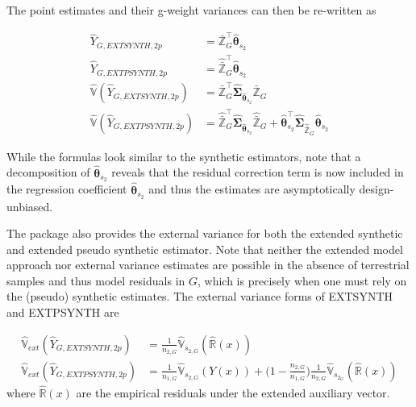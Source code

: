 \documentclass[article]{jss}
\newcommand{\var}{\mathbb{V}}
\begin{document}
The point estimates and their g-weight variances can then be re-written as

\begin{subequations}\label{eq:pest_2p_extsynth_extpsynth}
\begin{align}
\hat{Y}_{G,EXTSYNTH,2p} & = \bar{\pmb{\mathbb{Z}}}^{\top}_{G}\hat{\pmb{\theta}}_{s_2} \label{eq:pointest_2p_extsynth} \\
\hat{Y}_{G,EXTPSYNTH,2p} & =\hat{\bar{\pmb{\mathbb{Z}}}}_{G}^{\top}\hat{\pmb{\theta}}_{s_2} \label{eq:pointest_2p_extsynth} \\
\hat{\var}(\hat{Y}_{G,EXTSYNTH,2p}) & = \bar{\pmb{\mathbb{Z}}}^{\top}_{G}\hat{\pmb{\Sigma}}_{\hat{\pmb{\theta}}_{s_2}}\bar{\pmb{\mathbb{Z}}}_{G} \label{eq:var_2p_extsynth} \\
\hat{\var}(\hat{Y}_{G,EXTPSYNTH,2p})& =
\hat{\bar{\pmb{\mathbb{Z}}}}_{G}^{\top}\hat{\pmb{\Sigma}}_{\hat{\pmb{\theta}}_{s_2}}
\hat{\bar{\pmb{\mathbb{Z}}}}_{G}
+ \hat{\pmb{\theta}}^{\top}_{s_2}\hat{\pmb{\Sigma}}_{\hat{\bar{\pmb{\mathbb{Z}}}}_{G}}\hat{\pmb{\theta}}_{s_2} \label{eq:var_2p_extpsynth}
\end{align}
\end{subequations}

While the formulas look similar to the synthetic estimators, note that a decomposition of $\hat{\pmb{\theta}}_{s_2}$ reveals that the residual correction term is now included in the regression coefficient $\hat{\pmb{\theta}}_{s_2}$ \citep{mandallaz2016} and thus the estimates are asymptotically design-unbiased.

The package also provides the external variance for both the extended synthetic and extended pseudo synthetic estimator. Note that neither the extended model approach nor external variance estimates are possible in the absence of terrestrial samples and thus model residuals in $G$, which is precisely when one must rely on the (pseudo) synthetic estimates. The external variance forms of EXTSYNTH and EXTPSYNTH are

\begin{subequations}\label{eq:ext_varexternal_2p_extsynth}
\begin{align}
  \hat{\var}_{ext}(\hat{Y}_{G,EXTSYNTH,2p}) & = \frac{1}{n_{2,G}}\hat{\var}_{s_{2,G}}(\hat{\mathbb{R}}(x)) \label{eq:ext_varexternal_2p_extsynth} \\
  \hat{\var}_{ext}(\hat{Y}_{G,EXTPSYNTH,2p}) & = \frac{1}{n_{1,G}}\hat{\var}_{s_{2,G}}(Y(x)) + \Big(1-\frac{n_{2,G}}{n_{1,G}}\Big)\frac{1}{n_{2,G}}\hat{\var}_{s_{2_G}}(\hat{\mathbb{R}}(x)) \label{eq:ext_varexternal_2p_extpsynth}
\end{align}
\end{subequations}
where $\hat{\mathbb{R}}(x)$ are the empirical residuals under the extended auxiliary vector.
\end{document}
